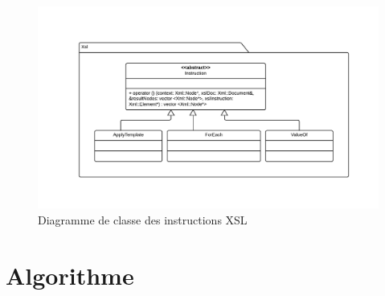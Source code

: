 \begin{landscape}
\begin{figure}[h!]
    \centering
    \includegraphics[width=\linewidth]{images/xsl-uml.pdf}
    \caption{Diagramme de classe des instructions XSL}
    \label{xslClassDiagram}
\end{figure}
\end{landscape}


\section{Algorithme}

